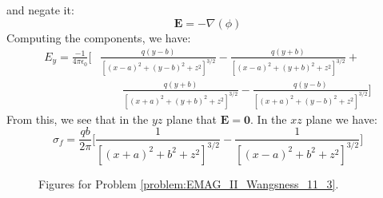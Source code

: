 \begin{solution}
                    and negate it:
                    \begin{equation}
                        \mathbf{E}=\minus\nabla(\phi)
                    \end{equation}
                    Computing the components, we have:
                    \begin{equation}
                        \begin{split}
                            E_{y}=\frac{\minus{1}}{4\pi\epsilon_{0}}\Big[
                                &
                                \frac{q(y-b)}
                                     {[(x-a)^{2}+(y-b)^{2}+z^{2}]^{3/2}}-
                                \frac{q(y+b)}
                                     {[(x-a)^{2}+(y+b)^{2}+z^{2}]^{3/2}}+
                                \\
                                &\quad\quad
                                \frac{q(y+b)}
                                     {[(x+a)^{2}+(y+b)^{2}+z^{2}]^{3/2}}-
                                \frac{q(y-b)}
                                     {[(x+a)^{2}+(y-b)^{2}+z^{2}]^{3/2}}
                            \Big]
                        \end{split}
                    \end{equation}
                    From this, we see that in the $yz$ plane that
                    $\mathbf{E}=\mathbf{0}$. In the $xz$ plane we have:
                    \begin{equation}
                        \sigma_{f}=\frac{qb}{2\pi}\Big[
                            \frac{1}{[(x+a)^{2}+b^{2}+z^{2}]^{3/2}}-
                            \frac{1}{[(x-a)^{2}+b^{2}+z^{2}]^{3/2}}
                        \Big]
                    \end{equation}
                \end{solution}
                \begin{figure}[H]
                    \centering
                    \captionsetup{type=figure}
                    \begin{subfigure}[b]{0.49\textwidth}
                        \centering
                        \resizebox{\textwidth}{!}{%
                            
                        }
                    \end{subfigure}
                    \begin{subfigure}[b]{0.49\textwidth}
                        \centering
                        \resizebox{\textwidth}{!}{%
                            
                        }
                    \end{subfigure}
                    \caption{Figures for Problem
                             \ref{problem:EMAG_II_Wangsness_11_3}.}
                    \label{fig:problem:EMAG_II_Wangsness_11_3}
                \end{figure}
